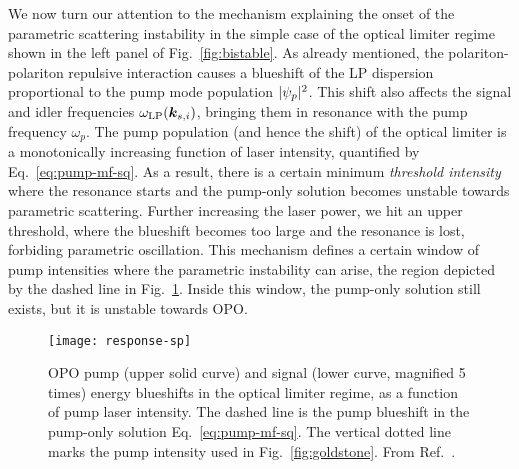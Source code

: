 We now turn our attention to the mechanism explaining the onset of the
parametric scattering instability in the simple case of the optical
limiter regime shown in the left panel of Fig.~\ref{fig:bistable}. As
already mentioned, the polariton-polariton repulsive interaction
causes a blueshift of the LP dispersion proportional to the pump mode
population $\vert \psi_p \vert^2$. This shift also affects the signal and
idler frequencies $\omega_{\text{LP}}(\bm{k}_{s,i})$, bringing them in
resonance with the pump frequency $\omega_p$. The pump population (and
hence the shift) of the optical limiter is a monotonically increasing
function of laser intensity, quantified by
Eq.~\eqref{eq:pump-mf-sq}. As a result, there is a certain minimum
\textit{threshold intensity} where the resonance starts and the
pump-only solution becomes unstable towards parametric
scattering. Further increasing the laser power, we hit an upper
threshold, where the blueshift becomes too large and the resonance is
lost, forbiding parametric oscillation. This mechanism defines a
certain window of pump intensities where the parametric instability
can arise, the region depicted by the dashed line in
Fig.~\ref{fig:spi}. Inside this window, the pump-only solution still
exists, but it is unstable towards OPO.
%
\begin{figure}[tb]\centering
  \texttt{[image: response-sp]}
  \caption{
    OPO pump (upper solid curve) and signal (lower curve, magnified 5 times) energy blueshifts in the optical limiter regime, as a function of pump laser intensity. The dashed line is the pump blueshift in the pump-only solution Eq.~\eqref{eq:pump-mf-sq}. The vertical dotted line marks the pump intensity used in Fig.~\ref{fig:goldstone}.
    From Ref.~\cite{Wouters_2007}.
  }\label{fig:spi}
\end{figure}
% 

